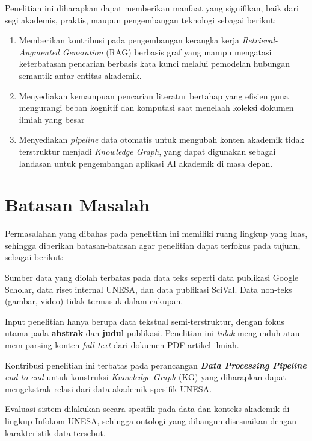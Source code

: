 Penelitian ini diharapkan dapat memberikan manfaat yang signifikan, baik dari segi akademis, praktis, maupun pengembangan teknologi sebagai berikut:

\begin{enumerate}
    \item Memberikan kontribusi pada pengembangan kerangka kerja \textit{Retrieval-Augmented Generation} (RAG) berbasis graf yang mampu mengatasi keterbatasan pencarian berbasis kata kunci melalui pemodelan hubungan semantik antar entitas akademik.
    
    \item Menyediakan kemampuan pencarian literatur bertahap yang efisien guna mengurangi beban kognitif dan komputasi saat menelaah koleksi dokumen ilmiah yang besar
    
    \item Menyediakan \textit{pipeline} data otomatis untuk mengubah konten akademik tidak terstruktur menjadi \textit{Knowledge Graph}, yang dapat digunakan sebagai landasan untuk pengembangan aplikasi AI akademik di masa depan.
\end{enumerate}

\section{Batasan Masalah}

Permasalahan yang dibahas pada penelitian ini memiliki ruang lingkup yang luas, sehingga diberikan batasan-batasan agar penelitian dapat terfokus pada tujuan, sebagai berikut:

\begin{daftar}
    \item Sumber data yang diolah terbatas pada data teks seperti data publikasi Google Scholar, data riset internal UNESA, dan data publikasi SciVal. Data non-teks (gambar, video) tidak termasuk dalam cakupan.
    
    \item Input penelitian hanya berupa data tekstual semi-terstruktur, dengan fokus utama pada \textbf{abstrak} dan \textbf{judul} publikasi. Penelitian ini \textit{tidak} mengunduh atau mem-parsing konten \textit{full-text} dari dokumen PDF artikel ilmiah.

    \item Kontribusi penelitian ini terbatas pada perancangan \textbf{\textit{Data Processing Pipeline}} \textit{end-to-end} untuk konstruksi \textit{Knowledge Graph} (KG) yang diharapkan dapat mengekstrak relasi dari data akademik spesifik UNESA.

    \item Evaluasi sistem dilakukan secara spesifik pada data dan konteks akademik di lingkup Infokom UNESA, sehingga ontologi yang dibangun disesuaikan dengan karakteristik data tersebut.
\end{daftar}